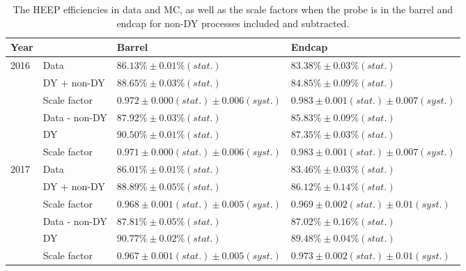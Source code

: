 \begin{table}[htp]
  \begin{center}
    \begin{tabular}{|l|l|l|l|}
      \hline
   Year &   & Barrel & Endcap \\ \hline \hline
\multirow{6}{*}{2016} &   Data          & $86.13\% \pm 0.01\%(stat.)$                   & $83.38\% \pm 0.03\%(stat.)$ \\
    &  DY + non-DY   & $88.65\% \pm 0.03\%(stat.)$                   & $84.85\% \pm 0.09\%(stat.)$ \\
    &  Scale factor  & $0.972  \pm 0.000(stat.)\pm 0.006(syst.)$     & $0.983   \pm 0.001(stat.) \pm 0.007(syst.) $ \\ \cline{2-4}
    &  Data - non-DY & $87.92\% \pm 0.03\%(stat.)$                   & $85.83\% \pm 0.09\%(stat.)$ \\
    &  DY            & $90.50\% \pm 0.01\%(stat.)$                   & $87.35\% \pm 0.03\%(stat.)$ \\
    &  Scale factor  & $0.971 \pm 0.000(stat.) \pm 0.006(syst.)$     & $0.983   \pm 0.001(stat.) \pm 0.007(syst.)$ \\
      \hline

\multirow{6}{*}{2017} &     Data          & $86.01\% \pm 0.01\%(stat.)$                   & $83.46\% \pm 0.03\%(stat.)$ \\
     & DY + non-DY   & $88.89\% \pm 0.05\%(stat.)$                   & $86.12\% \pm 0.14\%(stat.)$ \\
     & Scale factor  & $0.968  \pm 0.001(stat.)\pm 0.005(syst.)$     & $0.969   \pm 0.002(stat.)\pm 0.01(syst.)$ \\   \cline{2-4}
     & Data - non-DY & $87.81\% \pm 0.05\%(stat.)$                   & $87.02\% \pm 0.16\%(stat.)$ \\
     & DY            & $90.77\% \pm 0.02\%(stat.)$                   & $89.48\% \pm 0.04\%(stat.)$ \\
     & Scale factor  & $0.967 \pm 0.001(stat.)\pm 0.005(syst.)$      & $0.973   \pm 0.002(stat.)\pm 0.01(syst.)$ \\
      \hline
    \end{tabular}
  \end{center}
  \caption{\label{tab:HEEP_eff_nominal}
  The HEEP efficiencies in data and MC, as well as the scale factors when the probe is in the barrel and endcap for non-DY processes included and subtracted.}
\end{table}


